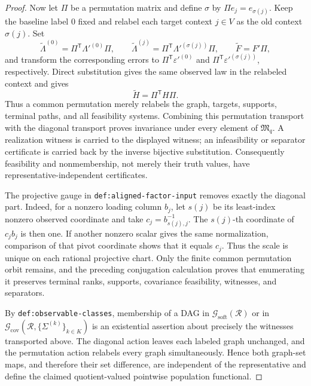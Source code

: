 \documentclass{article}
\begin{document}
\begin{proof}
Now let \(\Pi\) be a permutation matrix and define \(\sigma\) by
\(\Pi e_j=e_{\sigma(j)}\).  Keep the baseline label \(0\) fixed and relabel each
target context \(j\in V\) as the old context \(\sigma(j)\).  Set
\[
 \widetilde\Lambda^{(0)}=\Pi^{\mathsf T}\Lambda'^{(0)}\Pi,
 \qquad
 \widetilde\Lambda^{(j)}=\Pi^{\mathsf T}\Lambda'^{(\sigma(j))}\Pi,
 \qquad
 \widetilde F=F'\Pi,
\]
and transform the corresponding errors to \(\Pi^{\mathsf T}\varepsilon'^{(0)}\)
and \(\Pi^{\mathsf T}\varepsilon'^{(\sigma(j))}\), respectively.  Direct
substitution gives the same observed law in the relabeled context and gives
\[
 \widetilde H=\Pi^{\mathsf T}H\Pi.
\]
Thus a common permutation merely relabels the graph, targets, supports, terminal
paths, and all feasibility systems.  Combining this permutation transport with
the diagonal transport proves invariance under every element of
\(\mathfrak M_q\).  A realization witness is carried to the displayed witness;
an infeasibility or separator certificate is carried back by the inverse
bijective substitution.  Consequently feasibility and nonmembership, not merely
their truth values, have representative-independent certificates.

The projective gauge in \texttt{def:aligned-factor-input} removes exactly the
diagonal part.  Indeed, for a nonzero loading column \(b_j\), let \(s(j)\) be its
least-index nonzero observed coordinate and take
\(c_j=b_{s(j),j}^{-1}\).  The \(s(j)\)-th coordinate of \(c_jb_j\) is then one.
If another nonzero scalar gives the same normalization, comparison of that pivot
coordinate shows that it equals \(c_j\).  Thus the scale is unique on each
rational projective chart.  Only the finite common permutation orbit remains,
and the preceding conjugation calculation proves that enumerating it preserves
terminal ranks, supports, covariance feasibility, witnesses, and separators.

By \texttt{def:observable-classes}, membership of a DAG in
\(\mathcal G_{\mathrm{soft}}(\mathcal R)\) or in
\(\mathcal G_{\mathrm{cov}}(\mathcal R,\{\Sigma^{(k)}\}_{k\in K})\) is an
existential assertion about precisely the witnesses transported above.  The
diagonal action leaves each labeled graph unchanged, and the permutation action
relabels every graph simultaneously.  Hence both graph-set maps, and therefore
their set difference, are independent of the representative and define the
claimed quotient-valued pointwise population functional.


\end{proof}
\end{document}
